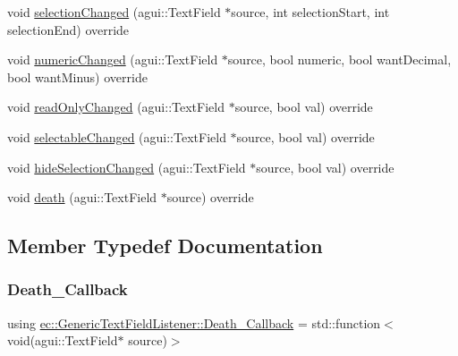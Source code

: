 \begin{DoxyCompactItemize}
void \mbox{\hyperlink{classec_1_1_generic_text_field_listener_a4f367bd9dc4080c21c99ca3862a37d9c}{selection\+Changed}} (agui\+::\+Text\+Field $\ast$source, int selection\+Start, int selection\+End) override
\item 
void \mbox{\hyperlink{classec_1_1_generic_text_field_listener_ab65f5b7d2527c5785c1ec5db708f19a2}{numeric\+Changed}} (agui\+::\+Text\+Field $\ast$source, bool numeric, bool want\+Decimal, bool want\+Minus) override
\item 
void \mbox{\hyperlink{classec_1_1_generic_text_field_listener_a3fd8ac7b4e08a382b74493a324d7e489}{read\+Only\+Changed}} (agui\+::\+Text\+Field $\ast$source, bool val) override
\item 
void \mbox{\hyperlink{classec_1_1_generic_text_field_listener_aa4c1f23d93458a196eac20b3870e1cf1}{selectable\+Changed}} (agui\+::\+Text\+Field $\ast$source, bool val) override
\item 
void \mbox{\hyperlink{classec_1_1_generic_text_field_listener_a53ee00fec8f9d4a56394521c2773cb5d}{hide\+Selection\+Changed}} (agui\+::\+Text\+Field $\ast$source, bool val) override
\item 
void \mbox{\hyperlink{classec_1_1_generic_text_field_listener_a3c4b1eb19fc23c30da3bc1786aea9a34}{death}} (agui\+::\+Text\+Field $\ast$source) override
\end{DoxyCompactItemize}


\subsection{Member Typedef Documentation}
\mbox{\label{classec_1_1_generic_text_field_listener_a720d56c97f2ac11e2658db516b186d4f}} 
\subsubsection{\texorpdfstring{Death\+\_\+\+Callback}{Death\_Callback}}
{\footnotesize\ttfamily using \mbox{\hyperlink{classec_1_1_generic_text_field_listener_a720d56c97f2ac11e2658db516b186d4f}{ec\+::\+Generic\+Text\+Field\+Listener\+::\+Death\+\_\+\+Callback}} =  std\+::function$<$void(agui\+::\+Text\+Field$\ast$ source)$>$}

